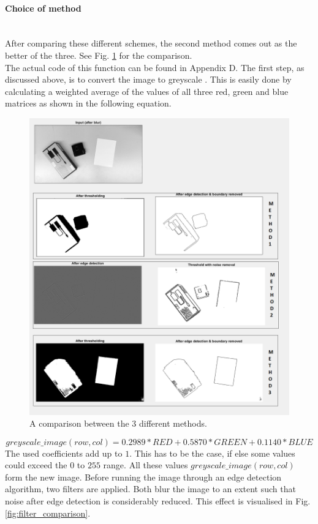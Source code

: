 \documentclass{article}
\begin{document}
\paragraph{Choice of method}\mbox{}\\
After comparing these different schemes, the second method comes out as the better of the three. See Fig. \ref{fig:comparison_methods} for the comparison.\\ The actual code of this function can be found in Appendix D. 
The first step, as discussed above, is to convert the image to greyscale \cite{greyscale}. This is easily done by calculating a weighted average of the values of all three red, green and blue matrices as shown in the following equation.
\begin{figure}[h]
\center
\includegraphics[width=0.7\linewidth]{comparison_methods.png}
\caption{A comparison between the 3 different methods.}
\label{fig:comparison_methods}
\end{figure}
\begin{equation}
greyscale\_image(row, col) = 0.2989 * RED + 0.5870 * GREEN + 0.1140 * BLUE
\end{equation}
The used coefficients add up to $1$. This has to be the case, if else some values could exceed the $0$ to $255$ range. All these values $greyscale\_image(row, col)$ form the new image.
\noindent Before running the image through an edge detection algorithm, two filters are applied. Both blur the image to an extent such that noise after edge detection is considerably reduced. This effect is visualised in Fig. \ref{fig:filter_comparison}.
\end{document}
